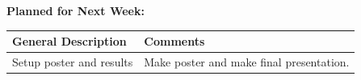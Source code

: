 \documentclass{article}
\begin{document}
\textbf{Planned for Next Week: }

\renewcommand{\arraystretch}{1.5}
\begin{table}[H]
    \centering
    \begin{tabularx}{0.95\textwidth} { 
        | >{\centering\arraybackslash}X
        | >{\centering\arraybackslash}X | }

    \hline
    \textbf{General Description} & \textbf{Comments} \\
    \hline
    Setup poster and results  & Make poster and make final presentation. \\
    \hline
    \end{tabularx}
\end{table}
\end{document}
